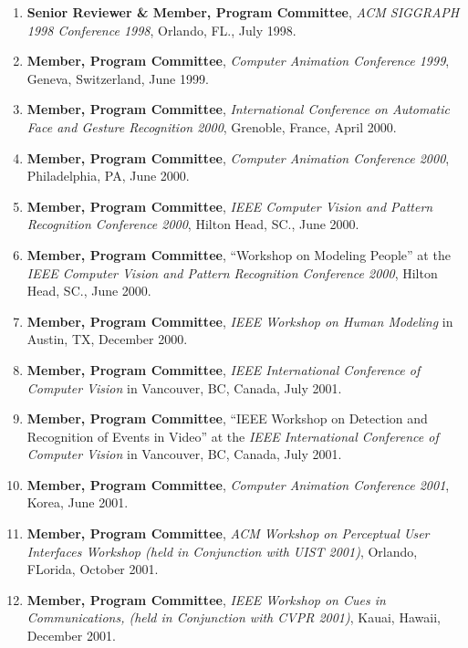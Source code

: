 \begin{enumerate}
\item {\bf Senior Reviewer \& Member, Program Committee}, \textit{ACM
SIGGRAPH 1998 Conference 1998}, Orlando, FL., July 1998.

\item {\bf Member, Program Committee}, \textit{Computer Animation
Conference 1999}, Geneva, Switzerland, June 1999.

\item {\bf Member, Program Committee}, \textit{International Conference on
Automatic Face and Gesture Recognition 2000}, Grenoble, France,
April 2000.

\item {\bf Member, Program Committee}, \textit{Computer Animation
Conference 2000}, Philadelphia, PA, June 2000.

\item {\bf Member, Program Committee}, \textit{IEEE Computer Vision and Pattern
Recognition Conference 2000}, Hilton Head, SC., June 2000.

\item {\bf Member, Program Committee}, ``Workshop on Modeling People''
at the \textit{IEEE Computer Vision and Pattern Recognition
Conference 2000}, Hilton Head, SC., June 2000.

\item{\bf Member, Program Committee}, \textit{IEEE Workshop on Human
Modeling} in Austin, TX, December 2000.

\item  {\bf Member, Program Committee}, \textit{IEEE International
Conference of Computer Vision} in Vancouver, BC, Canada, July
2001.

\item {\bf Member, Program Committee}, ``IEEE Workshop on Detection and
Recognition of Events in Video'' at the \textit{IEEE International
Conference of Computer Vision} in Vancouver, BC, Canada, July
2001.

\item  {\bf Member, Program Committee}, \textit{Computer Animation
Conference 2001}, Korea, June 2001.

\item {\bf Member, Program Committee}, \textit{ACM Workshop on Perceptual User
Interfaces Workshop (held in Conjunction with UIST 2001)},
Orlando, FLorida, October 2001.

\item {\bf Member, Program Committee}, \textit{IEEE Workshop on
Cues in Communications, (held in Conjunction with CVPR 2001)},
Kauai, Hawaii, December 2001.


\end{enumerate}

